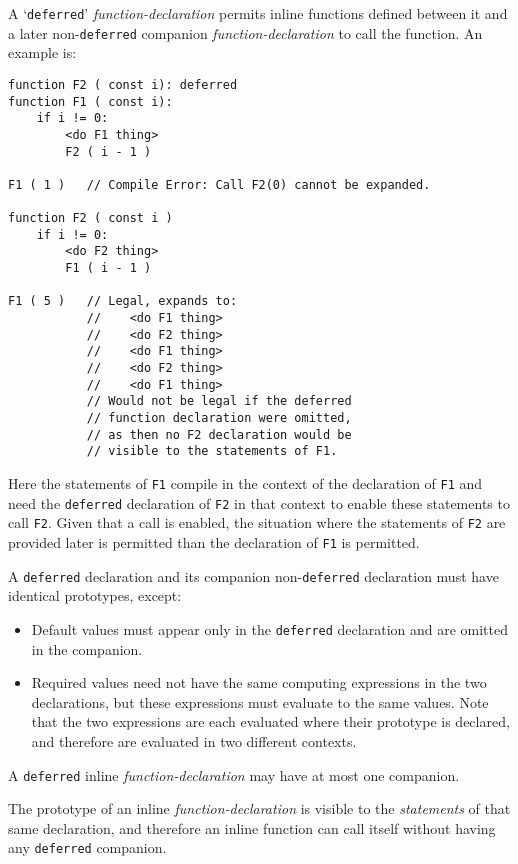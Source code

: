 \documentclass[12pt]{article}
\newenvironment{indpar}[1][0.3in]%
	{\begin{list}{}%
		     {\setlength{\itemsep}{0in}%
		      \setlength{\topsep}{0in}%
		      \setlength{\parsep}{1ex}%
		      \setlength{\labelwidth}{#1}%
		      \setlength{\leftmargin}{#1}%
		      \addtolength{\leftmargin}{\labelsep}}%
	 \item}%
	{\end{list}}
\begin{document}
A `{\tt deferred}' {\em function-declaration} permits
inline functions defined between it and a later
non-{\tt deferred} companion {\em function-declaration} to call the
function.  An example is:
\begin{indpar}\begin{verbatim}
function F2 ( const i): deferred
function F1 ( const i):
    if i != 0:
        <do F1 thing>
        F2 ( i - 1 )

F1 ( 1 )   // Compile Error: Call F2(0) cannot be expanded.

function F2 ( const i )
    if i != 0:
        <do F2 thing>
        F1 ( i - 1 )

F1 ( 5 )   // Legal, expands to:
           //    <do F1 thing>
           //    <do F2 thing>
           //    <do F1 thing>
           //    <do F2 thing>
           //    <do F1 thing>
           // Would not be legal if the deferred
           // function declaration were omitted,
           // as then no F2 declaration would be
           // visible to the statements of F1.
\end{verbatim}\end{indpar}
Here the statements of {\tt F1} compile in the context
of the declaration of {\tt F1} and need the {\tt deferred}
declaration of {\tt F2} in that context to enable these
statements to call {\tt F2}.  Given that a call is enabled,
the situation where the statements of {\tt F2} are provided later
is permitted than the declaration of {\tt F1} is permitted.

A {\tt deferred} declaration and its companion non-{\tt deferred}
declaration must have identical prototypes, except:
\label{COMPANION-DECLARATION}
\begin{itemize}
\item Default values must appear only in the {\tt deferred} declaration
and are omitted in the companion.
\item Required values need not have the same computing expressions
in the two declarations, but these expressions must evaluate to the
same values.  Note that the two expressions are each evaluated where
their prototype is declared, and therefore are evaluated in
two different contexts.
\end{itemize}

A {\tt deferred} inline {\em function-declaration} may have at
most one companion.

The prototype of an inline {\em function-declaration} is visible
to the {\em statements} of that same declaration, and therefore
an inline function can call itself without having any {\tt deferred}
companion.
\end{document}
